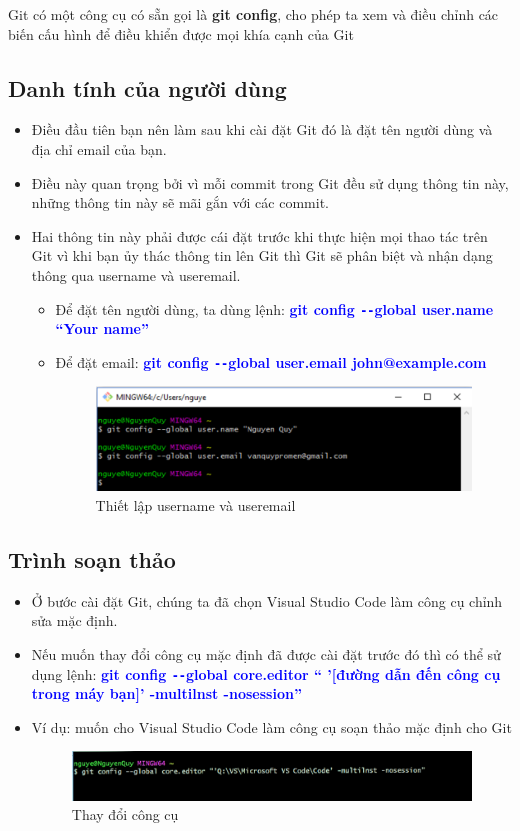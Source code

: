 \documentclass[12pt,a4paper]{report}
\begin{document}
Git có một công cụ có sẵn gọi là \textbf{git config}, cho phép ta xem và điều chỉnh các biến cấu hình để điều khiển được mọi khía cạnh của Git 
\subsection{Danh tính của người dùng}
\begin{itemize}
\item Điều đầu tiên bạn nên làm sau khi cài đặt Git đó là đặt tên người dùng và địa chỉ email của bạn.
\item Điều này quan trọng bởi vì mỗi commit trong Git đều sử dụng thông tin này, những thông tin này sẽ mãi gắn với các commit.
\item Hai thông tin này phải được cái đặt trước khi thực hiện mọi thao tác trên Git vì khi bạn ủy thác thông tin lên Git thì Git sẽ phân biệt và nhận dạng thông qua username và useremail.
	\begin{itemize}
		\item Để đặt tên người dùng, ta dùng lệnh: \textcolor{blue}{\bf  git config \texttt{-{}-}global user.name “Your name”}
		\item Để đặt email: \textcolor{blue}{\bf git config \texttt{-{}-}global user.email john@example.com}
	\begin{figure}
		\centering
	\includegraphics[width=0.8\linewidth]{screenshot001}
	\caption{Thiết lập username và useremail}
	\label{fig:screenshot001}
\end{figure}
	\end{itemize}
\end{itemize}

\subsection{Trình soạn thảo}
\begin{itemize}
\item Ở bước cài đặt Git, chúng ta đã chọn Visual Studio Code làm công cụ chỉnh sửa mặc định.
\item Nếu muốn thay đổi công cụ mặc định đã được cài đặt trước đó thì có thể sử dụng lệnh:
\textcolor{blue}{\bf git config \texttt{-{}-}global core.editor “ ’[đường dẫn đến công cụ trong máy bạn]’ -multilnst -nosession”}
\item Ví dụ: muốn cho Visual Studio Code làm công cụ soạn thảo mặc định cho Git
	\begin{figure}[!ht]
	\centering
	\includegraphics[width=0.8\linewidth]{screenshot002}
	\caption{Thay đổi công cụ}
	\label{fig:screenshot002}
\end{figure}
\end{itemize}
\end{document}
